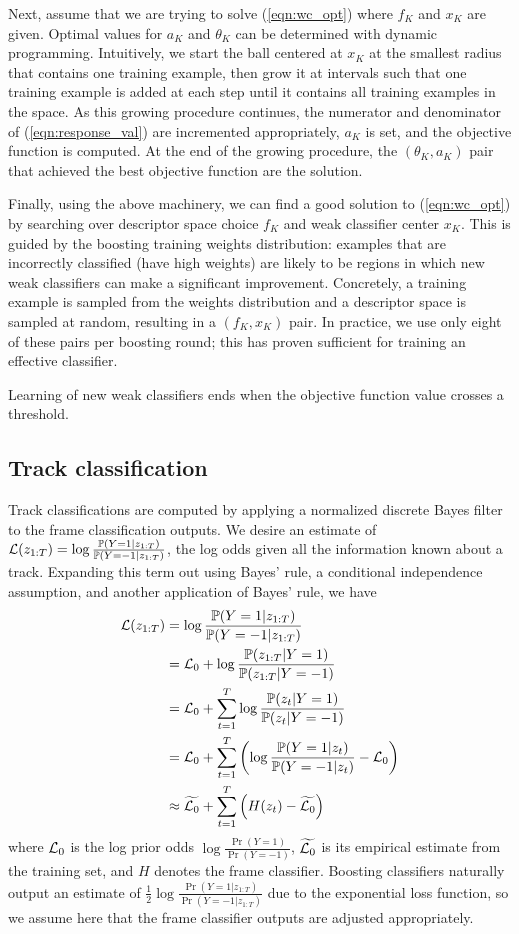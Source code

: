 \documentclass[conference]{IEEEtran}
\newcommand{\logodds}[1]{\log \frac{\Pr(Y = 1 | #1)}{\Pr(Y = -1 | #1)}}
\newcommand{\logprior}{\log \frac{\Pr(Y = 1)}{\Pr(Y = -1)}}
\newcommand{\zT}{z_{1:T}}
\begin{document}
Next, assume that we are trying to solve (\ref{eqn:wc_opt}) where $f_K$ and $x_K$ are given.  Optimal values for $a_K$ and $\theta_K$ can be determined with dynamic programming.  Intuitively, we start the ball centered at $x_K$ at the smallest radius that contains one training example, then grow it at intervals such that one training example is added at each step until it contains all training examples in the space.  As this growing procedure continues, the numerator and denominator of (\ref{eqn:response_val}) are incremented appropriately, $a_K$ is set, and the objective function is computed.  At the end of the growing procedure, the $(\theta_K, a_K)$ pair that achieved the best objective function are the solution.

Finally, using the above machinery, we can find a good solution to (\ref{eqn:wc_opt}) by searching over descriptor space choice $f_K$ and weak classifier center $x_K$.  This is guided by the boosting training weights distribution: examples that are incorrectly classified (\ie have high weights) are likely to be regions in which new weak classifiers can make a significant improvement.  Concretely, a training example is sampled from the weights distribution and a descriptor space is sampled at random, resulting in a $(f_K, x_K)$ pair.  In practice, we use only eight of these pairs per boosting round; this has proven sufficient for training an effective classifier.

Learning of new weak classifiers ends when the objective function value crosses a threshold.

\subsection{Track classification}

\newcommand{\Htr}{H^{\mbox{\tiny{Tr}}}}
\newcommand{\Hf}{H^{\mbox{\tiny{F}}}}

Track classifications are computed by applying a normalized discrete Bayes filter to the frame classification outputs.  We desire an estimate of $\L(\zT) = \logodds{\zT}$, the log odds given all the information known about a track.  Expanding this term out using Bayes' rule, a conditional independence assumption, and another application of Bayes' rule, we have
\begin{align}
  \L(z_{1:T}) & = \logodds{\zT} \notag \\
  & =  \L_0 + \log \frac{\Pr(\zT | Y = 1)}{\Pr(\zT | Y = -1)} \notag \\
  & = \L_0 + \sum_{t=1}^T \log \frac{\Pr(z_t | Y = 1)}{\Pr(z_t | Y = -1)} \notag \\
  & = \L_0 + \sum_{t=1}^T \left( \log \frac{\Pr(Y = 1 | z_t)}{\Pr(Y = -1 | z_t)} - \L_0 \right) \notag \\
  & \approx \widetilde{\L_0} + \sum_{t=1}^T \left( H(z_t) -\widetilde{\L_0} \right) \label{eqn:ndbf}
\end{align}
where $\mathcal{L}_0$ is the log prior odds $\logprior$, $\widetilde{\mathcal{L}_0}$ is its empirical estimate from the training set, and $H$ denotes the frame classifier.  Boosting classifiers naturally output an estimate of $\frac{1}{2} \logodds{\zT}$ due to the exponential loss function, so we assume here that the frame classifier outputs are adjusted appropriately.
\end{document}
